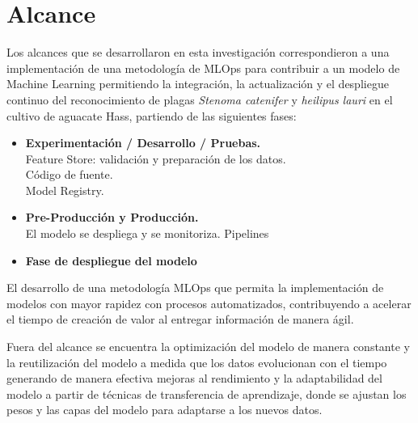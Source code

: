 \section{Alcance}
Los alcances que se desarrollaron en esta investigación correspondieron a una implementación de una metodología de MLOps para contribuir a un modelo de Machine Learning permitiendo la integración, la actualización y el despliegue continuo del reconocimiento de plagas \textit{Stenoma catenifer} y \textit{heilipus lauri} en el cultivo de aguacate Hass, partiendo de las siguientes fases:

\begin{itemize}
  \item \textbf{Experimentación / Desarrollo / Pruebas.}\\
    Feature Store: validación y preparación de los datos.\\
    Código de fuente.\\
    Model Registry.
  \item \textbf{Pre-Producción y Producción.}\\
    El modelo se despliega y se monitoriza.
    Pipelines
  \item \textbf{Fase de despliegue del modelo}
\end{itemize}

El desarrollo de una metodología MLOps que permita la implementación de modelos con mayor rapidez con procesos automatizados, contribuyendo a acelerar el tiempo de creación de valor al entregar información de manera ágil.

Fuera del alcance se encuentra la optimización del modelo de manera constante y la reutilización del modelo a medida que los datos evolucionan con el tiempo generando de manera efectiva mejoras al rendimiento y la adaptabilidad del modelo a partir de técnicas de transferencia de aprendizaje, donde se ajustan los pesos y las capas del modelo para adaptarse a los nuevos datos.

